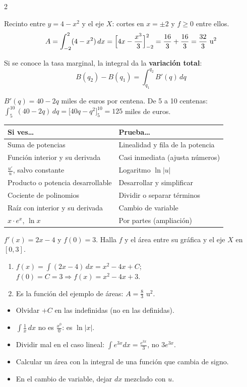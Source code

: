 \documentclass[10pt]{article}
\begin{document}
\begin{multicols}{2}
\begin{ejemplo}
Recinto entre \(y=4-x^2\) y el eje \(X\): cortes en \(x=\pm2\) y \(f\ge0\) entre ellos.
\[A=\int_{-2}^{2}(4-x^2)\,dx=\Bigl[4x-\frac{x^3}3\Bigr]_{-2}^{2}=\frac{16}3+\frac{16}3=\frac{32}3\ \text{u}^2\]
\end{ejemplo}

Si se conoce la tasa marginal, la integral da la \textbf{variación total}:
\[B(q_2)-B(q_1)=\int_{q_1}^{q_2}B'(q)\,dq\]
\begin{ejemplo}
\(B'(q)=40-2q\) miles de euros por centena. De 5 a 10 centenas: \(\int_5^{10}(40-2q)\,dq=\bigl[40q-q^2\bigr]_5^{10}=125\) miles de euros.
\end{ejemplo}

\begin{tabular}{@{}p{3.2cm}p{4.6cm}@{}}
\textbf{Si ves\ldots} & \textbf{Prueba\ldots}\\ \hline
Suma de potencias & Linealidad y fila de la potencia\\
Función interior y su derivada & Casi inmediata (ajusta números)\\
\(\frac{u'}u\), salvo constante & Logaritmo \(\ln|u|\)\\
Producto o potencia desarrollable & Desarrollar y simplificar\\
Cociente de polinomios & Dividir o separar términos\\
Raíz con interior y su derivada & Cambio de variable\\
\(x\cdot e^x\), \(\ln x\) & Por partes (ampliación)
\end{tabular}

\(f'(x)=2x-4\) y \(f(0)=3\). Halla \(f\) y el área entre su gráfica y el eje \(X\) en \([0,3]\).
\begin{enumerate}
  \item \(f(x)=\int(2x-4)\,dx=x^2-4x+C\); \(f(0)=C=3\Rightarrow f(x)=x^2-4x+3\).
  \item Es la función del ejemplo de áreas: \(A=\frac83\) u\(^2\).
\end{enumerate}

\begin{ojo}
\begin{itemize}
  \item Olvidar \(+C\) en las indefinidas (no en las definidas).
  \item \(\int\frac1x\,dx\) no es \(\frac{x^0}0\): es \(\ln|x|\).
  \item Dividir mal en el caso lineal: \(\int e^{3x}dx=\frac{e^{3x}}3\), no \(3e^{3x}\).
  \item Calcular un área con la integral de una función que cambia de signo.
  \item En el cambio de variable, dejar \(dx\) mezclado con \(u\).
\end{itemize}
\end{ojo}

\end{multicols}
\end{document}
